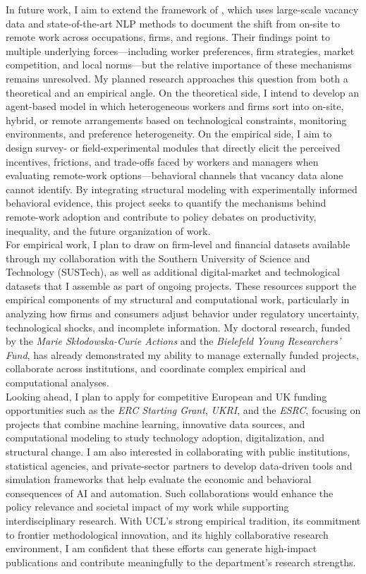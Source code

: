 \documentclass{nfr}
\begin{document}
In future work, I aim to extend the framework of \citet{hansen2023remote}, which uses large-scale vacancy data and state-of-the-art NLP methods to document the shift from on-site to remote work across occupations, firms, and regions. Their findings point to multiple underlying forces—including worker preferences, firm strategies, market competition, and local norms—but the relative importance of these mechanisms remains unresolved. 
My planned research approaches this question from both a theoretical and an empirical angle. On the theoretical side, I intend to develop an agent-based model in which heterogeneous workers and firms sort into on-site, hybrid, or remote arrangements based on technological constraints, monitoring environments, and preference heterogeneity. On the empirical side, I aim to design survey- or field-experimental modules that directly elicit the perceived incentives, frictions, and trade-offs faced by workers and managers when evaluating remote-work options—behavioral channels that vacancy data alone cannot identify. 
By integrating structural modeling with experimentally informed behavioral evidence, this project seeks to quantify the mechanisms behind remote-work adoption and contribute to policy debates on productivity, inequality, and the future organization of work.\\

For empirical work, I plan to draw on firm-level and financial datasets available through my collaboration with the Southern University of Science and Technology (SUSTech), as well as additional digital-market and technological datasets that I assemble as part of ongoing projects. These resources support the empirical components of my structural and computational work, particularly in analyzing how firms and consumers adjust behavior under regulatory uncertainty, technological shocks, and incomplete information. 
My doctoral research, funded by the \textit{Marie Skłodowska-Curie Actions} and the \textit{Bielefeld Young Researchers’ Fund}, has already demonstrated my ability to manage externally funded projects, collaborate across institutions, and coordinate complex empirical and computational analyses.\\

Looking ahead, I plan to apply for competitive European and UK funding opportunities such as the \textit{ERC Starting Grant}, \textit{UKRI}, and the \textit{ESRC}, focusing on projects that combine machine learning, innovative data sources, and computational modeling to study technology adoption, digitalization, and structural change. 
I am also interested in collaborating with public institutions, statistical agencies, and private-sector partners to develop data-driven tools and simulation frameworks that help evaluate the economic and behavioral consequences of AI and automation. 
Such collaborations would enhance the policy relevance and societal impact of my work while supporting interdisciplinary research. 
With UCL’s strong empirical tradition, its commitment to frontier methodological innovation, and its highly collaborative research environment, I am confident that these efforts can generate high-impact publications and contribute meaningfully to the department’s research strengths.\\
\end{document}
